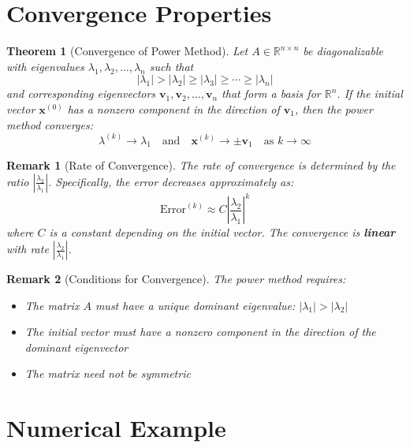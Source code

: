 \documentclass[11pt, a4paper]{article}
\newtheorem{theorem}{Theorem}
\newtheorem{remark}{Remark}
\begin{document}
\section{Convergence Properties}

\begin{theorem}[Convergence of Power Method]
Let $A \in \mathbb{R}^{n \times n}$ be diagonalizable with eigenvalues $\lambda_1, \lambda_2, \ldots, \lambda_n$ such that
\begin{equation}
    |\lambda_1| > |\lambda_2| \geq |\lambda_3| \geq \cdots \geq |\lambda_n|
\end{equation}
and corresponding eigenvectors $\mathbf{v}_1, \mathbf{v}_2, \ldots, \mathbf{v}_n$ that form a basis for $\mathbb{R}^n$. If the initial vector $\mathbf{x}^{(0)}$ has a nonzero component in the direction of $\mathbf{v}_1$, then the power method converges:
\begin{equation}
    \lambda^{(k)} \to \lambda_1 \quad \text{and} \quad \mathbf{x}^{(k)} \to \pm \mathbf{v}_1 \quad \text{as } k \to \infty
\end{equation}
\end{theorem}

\begin{remark}[Rate of Convergence]
The rate of convergence is determined by the ratio $\left|\frac{\lambda_2}{\lambda_1}\right|$. Specifically, the error decreases approximately as:
\begin{equation}
    \text{Error}^{(k)} \approx C \left|\frac{\lambda_2}{\lambda_1}\right|^k
\end{equation}
where $C$ is a constant depending on the initial vector. The convergence is \textbf{linear} with rate $\left|\frac{\lambda_2}{\lambda_1}\right|$.
\end{remark}

\begin{remark}[Conditions for Convergence]
The power method requires:
\begin{itemize}
    \item The matrix $A$ must have a unique dominant eigenvalue: $|\lambda_1| > |\lambda_2|$
    \item The initial vector must have a nonzero component in the direction of the dominant eigenvector
    \item The matrix need not be symmetric
\end{itemize}
\end{remark}

\section{Numerical Example}
\end{document}
